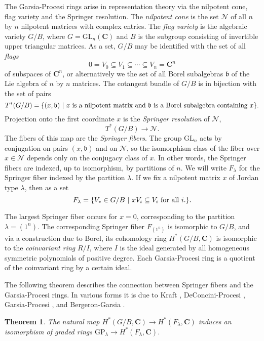 \documentclass[12pt, reqno]{amsart}
\numberwithin{equation}{section}
\theoremstyle{definition}
\theoremstyle{plain}
\newtheorem{theorem}{Theorem}[section]
\newcommand{\CC}{\mathbf{C}}
\begin{document}
The Garsia-Procesi rings arise in representation theory via the nilpotent cone, flag variety and the Springer resolution. The \emph{nilpotent cone} is the set $\mathcal{N}$ of all $n$ by $n$ nilpotent matrices with complex entries. The \emph{flag variety} is the algebraic variety $G/B$, where $G=\mathrm{GL}_n(\CC)$ and $B$ is the subgroup consisting of invertible upper triangular matrices. As a set, $G/B$ may be identified with the set of all \emph{flags} $$0=V_0 \subseteq V_1 \subseteq \cdots \subseteq V_n=\CC^n$$ of subspaces of $\CC^n$, or alternatively we the set of all Borel subalgebras $\mathfrak{b}$ of the Lie algebra of $n$ by $n$ matrices. The cotangent bundle of $G/B$ is in bijection with the set of pairs
$$T^*(G/B)=\{(x,\mathfrak{b}) \ | \ \hbox{$x$ is a nilpotent matrix and $\mathfrak{b}$ is a Borel subalgebra containing $x$} \}.$$ Projection onto the first coordinate $x$ is the \emph{Springer resolution} of $\mathcal{N}$, 
$$T^*(G/B) \longrightarrow \mathcal{N}.$$ The fibers of this map are the \emph{Springer fibers}. The group $\mathrm{GL}_n$ acts by conjugation on pairs $(x,\mathfrak{b})$ and on $\mathcal{N}$, so the isomorphism class of the fiber over $x \in \mathcal{N}$ depends only on the conjugacy class of $x$. In other words, the Springer fibers are indexed, up to isomorphism, by partitions of $n$. We will write $F_\lambda$ for the Springer fiber indexed by the partition $\lambda$. If we fix a nilpotent matrix $x$ of Jordan type $\lambda$, then as a set
$$F_\lambda=\{V_* \in G/B \ | \ x V_i \subseteq V_i \ \hbox{for all $i$.} \}.$$

The largest Springer fiber occurs for $x=0$, corresponding to the partition $\lambda=(1^n)$. The corresponding Springer fiber $F_{(1^n)}$ is isomorphic to $G/B$, and via a construction due to Borel, its cohomology ring $H^*(G/B,\CC)$ is isomorphic to the \emph{coinvariant ring} $R/I$, where $I$ is the ideal generated by all homogeneous symmetric polynomials of positive degree. Each Garsia-Procesi ring is a quotient of the coinvariant ring by a certain ideal.

The following theorem describes the connection between Springer fibers and the Garsia-Procesi rings. In various forms it is due to Kraft \cite{Kra}, DeConcini-Procesi \cite{DCoPr}, Garsia-Procesi \cite{GaPr}, and Bergeron-Garsia \cite{BeGa}.
\begin{theorem}
The natural map $H^*(G/B,\CC) \rightarrow H^*(F_\lambda,\CC)$ induces an isomorphism of graded rings $\mathrm{GP}_\lambda \longrightarrow H^*(F_\lambda,\CC)$. 
\end{theorem}
\end{document}
